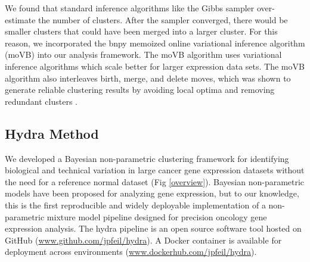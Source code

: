 \documentclass[10pt,letterpaper]{article}
\begin{document}
We found that standard inference algorithms like the Gibbs sampler over-estimate the number of clusters. After the sampler converged, there would be smaller clusters that could have been merged into a larger cluster. For this reason, we incorporated the bnpy memoized online variational inference algorithm (moVB) \cite{hughes2013memoized} into our analysis framework. The moVB algorithm uses variational inference algorithms which scale better for larger expression data sets. The moVB algorithm also interleaves birth, merge, and delete moves, which was shown to generate reliable clustering results by avoiding local optima and removing redundant clusters \cite{hughesBnpyReliableScalable}. 

\subsection{Hydra Method}
We developed a Bayesian non-parametric clustering framework for identifying biological and technical variation in large cancer gene expression datasets without the need for a reference normal dataset (Fig \ref{overview}). Bayesian non-parametric models have been proposed for analyzing gene expression, but to our knowledge, this is the first reproducible and widely deployable implementation of a non-parametric mixture model pipeline designed for precision oncology gene expression analysis. The hydra pipeline is an open source software tool hosted on GitHub (\url{www.github.com/jpfeil/hydra}). A Docker container is available for deployment across environments (\url{www.dockerhub.com/jpfeil/hydra}).
\end{document}
